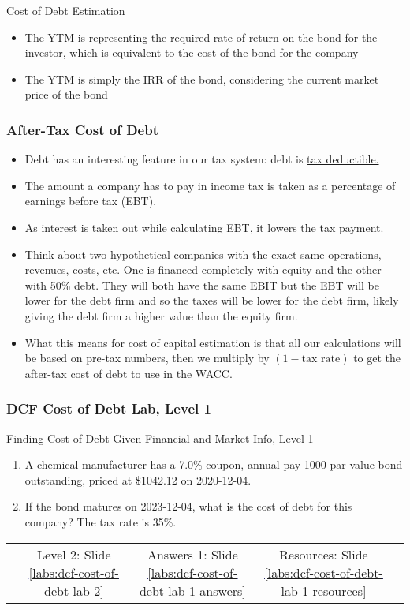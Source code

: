 \documentclass[handout, 11pt]{beamer}
\begin{document}
\begin{section}[Debt]{Cost of Debt Estimation}
\begin{frame}
\begin{itemize}
\vfill
\item The YTM is representing the required rate of return on the bond for the investor, which is equivalent to the cost of the bond for the company
\vfill
\item The YTM is simply the IRR of the bond, considering the current market price of the bond
\end{itemize}
\end{frame}
\begin{frame}
\frametitle{After-Tax Cost of Debt}
\begin{itemize}
\small
\vfill
\item Debt has an interesting feature in our tax system: debt is
\underline{tax deductible.}
\vfill
\item The amount a company has to pay in income tax is taken as a percentage of earnings before tax (EBT).
\vfill
\item As interest is taken out while calculating EBT, it lowers the tax payment.
\vfill
\item Think about two hypothetical companies with the exact same operations, revenues, costs, etc. One is financed completely with equity and the other with 50\% debt. They will both have the same EBIT but the EBT will be lower for the debt firm and so the taxes will be lower for the debt firm, likely giving the debt firm a higher value than the equity firm.
\vfill
\item What this means for cost of capital estimation is that all our calculations will be based on pre-tax numbers, then we multiply by $(1 - \text{tax rate})$ to get the after-tax cost of debt to use in the WACC.
\end{itemize}
\end{frame}
\begin{frame}
\frametitle{DCF Cost of Debt Lab, Level 1}
{
\begin{block}{Finding Cost of Debt Given Financial and Market Info, Level 1}
\begin{enumerate}
\item A chemical manufacturer has a 7.0\% coupon, annual pay 1000 par value bond outstanding, priced at \$1042.12 on 2020-12-04.
\item If the bond matures on 2023-12-04, what is the cost of debt for this company? The tax rate is 35\%.
\end{enumerate}
\vfill
\begin{tabular*}{\textwidth}{@{\extracolsep{\fill}}ccccc}
\toprule
\hfill & Level 2: Slide \textcolor{blue}{\underline{\ref{labs:dcf-cost-of-debt-lab-2}}} & Answers 1: Slide \textcolor{blue}{\underline{\ref{labs:dcf-cost-of-debt-lab-1-answers}}} & Resources: Slide \textcolor{blue}{\underline{\ref{labs:dcf-cost-of-debt-lab-1-resources}}} & \hfill\\


\end{tabular*}
\end{block}}
\end{frame}
\end{section}
\end{document}
